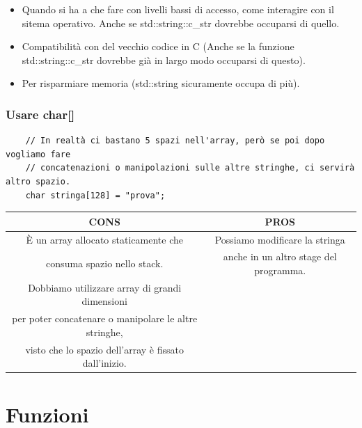 \begin{itemize}
	\item \textsf{\small Quando si ha a che fare con livelli bassi di accesso, come interagire con il sitema operativo. Anche se std::string::c\_str dovrebbe occuparsi di quello.}
	\item \textsf{\small Compatibilità con del vecchio codice in C (Anche se la funzione std::string::c\_str dovrebbe già in largo modo occuparsi di questo).}
	\item \textsf{\small Per risparmiare memoria (std::string sicuramente occupa di più).}
\end{itemize}

\subsubsection{Usare char[]}

\begin{lstlisting}
	// In realtà ci bastano 5 spazi nell'array, però se poi dopo vogliamo fare
	// concatenazioni o manipolazioni sulle altre stringhe, ci servirà altro spazio.
	char stringa[128] = "prova";
\end{lstlisting}

\begin{tabular}{|c|c|}
	\hline
	\color{red} CONS & \color{Green} PROS \\
	\hline
	\textsf{\small È un array allocato staticamente che } & \textsf{\small Possiamo modificare la stringa } \\
	\textsf{\small consuma spazio nello stack.} & \textsf{\small anche in un altro stage del programma.} \\
	\hline
	\textsf{\small Dobbiamo utilizzare array di grandi dimensioni  } & \textsf{\small } \\
	\textsf{\small per poter concatenare o manipolare le altre stringhe,} & \textsf{\small } \\
	\textsf{\small visto che lo spazio dell'array è fissato dall'inizio.} & \textsf{\small } \\
	\hline
\end{tabular}


\newpage

\section{Funzioni}

